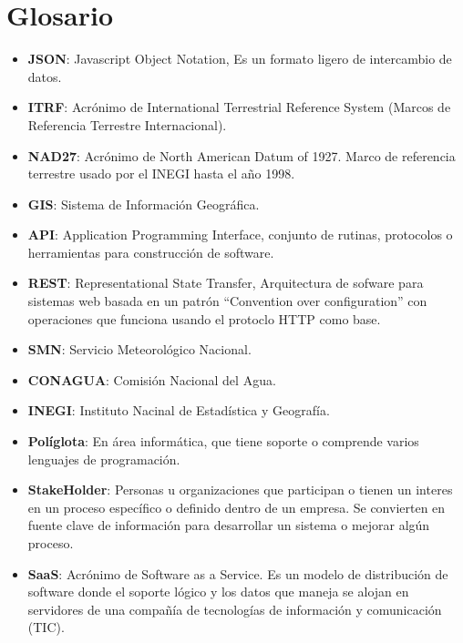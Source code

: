 \newpage
\section*{Glosario}
\begin{itemize}
	\item \textbf{JSON}: Javascript Object Notation, Es un formato ligero de intercambio de datos.
	\item \textbf{ITRF}: Acrónimo de International Terrestrial Reference System (Marcos de Referencia Terrestre Internacional).
	\item \textbf{NAD27}: Acrónimo de North American Datum of 1927. Marco de referencia terrestre usado por el INEGI hasta el año 1998.
	\item \textbf{GIS}: Sistema de Información Geográfica.
  \item \textbf{API}: Application Programming Interface, conjunto de rutinas, protocolos o herramientas para construcción de software.
  \item \textbf{REST}: Representational State Transfer, Arquitectura de sofware para sistemas web basada en un patrón ``Convention over configuration'' con operaciones que funciona usando el protoclo HTTP como base.
  \item \textbf{SMN}: Servicio Meteorológico Nacional.
  \item \textbf{CONAGUA}: Comisión Nacional del Agua.
  \item \textbf{INEGI}: Instituto Nacinal de Estadística y Geografía.
  \item \textbf{Políglota}: En área informática, que tiene soporte o comprende varios lenguajes de programación.
  \item \textbf{StakeHolder}: Personas u organizaciones que participan o tienen un interes en un proceso específico o definido dentro de un empresa. Se convierten en fuente clave de información para desarrollar un sistema o mejorar algún proceso.
  \item \textbf{SaaS}: Acrónimo de Software as a Service. Es un modelo de distribución de software donde el soporte lógico y los datos que maneja se alojan en servidores de una compañía de tecnologías de información y comunicación (TIC).
\end{itemize}
